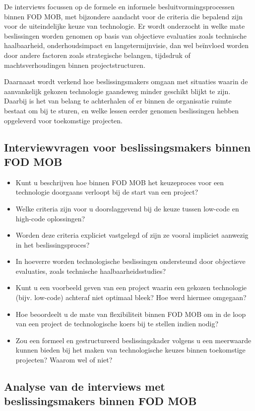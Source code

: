 De interviews focussen op de formele en informele besluitvormingsprocessen binnen \gls{FOD MOB}, met bijzondere aandacht voor de criteria die bepalend zijn voor de uiteindelijke keuze van technologie. Er wordt onderzocht in welke mate beslissingen worden genomen op basis van objectieve evaluaties zoals technische haalbaarheid, onderhoudsimpact en langetermijnvisie, dan wel beïnvloed worden door andere factoren zoals strategische belangen, tijdsdruk of machtsverhoudingen binnen projectstructuren.

Daarnaast wordt verkend hoe beslissingsmakers omgaan met situaties waarin de aanvankelijk gekozen technologie gaandeweg minder geschikt blijkt te zijn. Daarbij is het van belang te achterhalen of er binnen de organisatie ruimte bestaat om bij te sturen, en welke lessen eerder genomen beslissingen hebben opgeleverd voor toekomstige projecten.

\subsection{Interviewvragen voor beslissingsmakers binnen \gls{FOD MOB}}
\begin{itemize}
    \item Kunt u beschrijven hoe binnen \gls{FOD MOB} het keuzeproces voor een technologie doorgaans verloopt bij de start van een project?
    \item Welke criteria zijn voor u doorslaggevend bij de keuze tussen low-code en high-code oplossingen?
    \item Worden deze criteria expliciet vastgelegd of zijn ze vooral impliciet aanwezig in het beslissingsproces?
    \item In hoeverre worden technologische beslissingen ondersteund door objectieve evaluaties, zoals technische haalbaarheidsstudies?
    \item Kunt u een voorbeeld geven van een project waarin een gekozen technologie (bijv. low-code) achteraf niet optimaal bleek? Hoe werd hiermee omgegaan?
    \item Hoe beoordeelt u de mate van flexibiliteit binnen \gls{FOD MOB} om in de loop van een project de technologische koers bij te stellen indien nodig?
    \item Zou een formeel en gestructureerd beslissingskader volgens u een meerwaarde kunnen bieden bij het maken van technologische keuzes binnen toekomstige projecten? Waarom wel of niet?
\end{itemize}

\subsection{Analyse van de interviews met beslissingsmakers binnen \gls{FOD MOB}}

